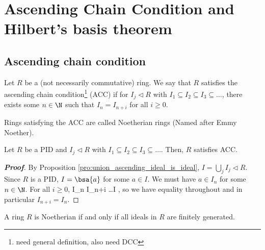 \section{Ascending Chain Condition and Hilbert's basis theorem}

\subsection{Ascending chain condition}

\begin{definition}\label{def:ascending_chain_condition}
Let $R$ be a (not necessarily commutative) ring.  We say that $R$ satisfies the ascending chain condition\footnote{need general definition, also need DCC} (ACC) if for $I_j \lhd R$ with $I_1 \subseteq I_2 \subseteq I_3 \subseteq \dots$, there exists some $n \in \N$ such that $I_n = I_{n+i}$ for all $i \geq 0$.
\end{definition}

\begin{definition}\label{def:noetherian_ring}
Rings satisfying the ACC are called Noetherian rings (Named after Emmy Noether).
\end{definition}


\begin{lemma}\label{lem:pid_implies_acc}
Let $R$ be a PID and $I_j \lhd R$ with $I_1 \subseteq I_2 \subseteq I_3 \subseteq \dots$. Then, $R$ satisfies ACC.
\end{lemma}

\begin{proof}[\bf Proof]
By Proposition \ref{pro:union_ascending_ideal_is_ideal}, $I = \bigcup_j I_j \lhd R$. Since $R$ is a PID, $I = \bsa{a}$ for some $a \in I$. We must have $a \in I_n$ for some $n \in \N$. For all $i \geq 0$,
\be
{} \subseteq I_n \subseteq I_{n+i} \subseteq \dots \subseteq I \subseteq {},
\ee
so we have equality throughout and in particular $I_{n+i} = I_n$.
\end{proof}


\begin{lemma}\label{lem:noetherian_iff_ideal_finitely_generated}
A ring $R$ is Noetherian if and only if all ideals in $R$ are finitely generated.
\end{lemma}


